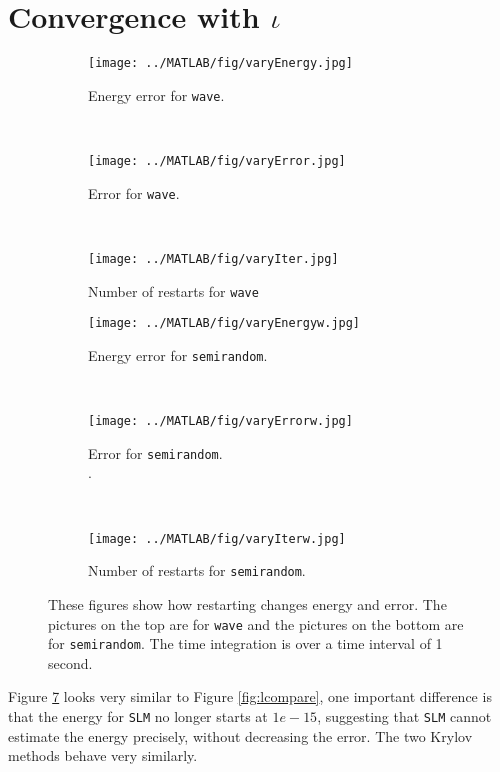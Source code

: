 \section{Convergence with $\iota$} %

\begin{figure}[H]
        \centering
        \begin{subfigure}[b]{0.3\textwidth}
                \texttt{[image: ../MATLAB/fig/varyEnergy.jpg]}
                \caption{ Energy error for \texttt{wave}. }
                \label{fig:varyEnergy}
        \end{subfigure}%
        ~
		\begin{subfigure}[b]{0.3\textwidth}
                \texttt{[image: ../MATLAB/fig/varyError.jpg]}
                \caption{ Error for \texttt{wave}. }
                \label{fig:varyError}
        \end{subfigure}%
        ~
        \begin{subfigure}[b]{0.3\textwidth}
                \texttt{[image: ../MATLAB/fig/varyIter.jpg]}
                \caption{ Number of restarts for \texttt{wave} }
                \label{fig:varyIter}
        \end{subfigure}%
        
        \begin{subfigure}[b]{0.3\textwidth}
                \texttt{[image: ../MATLAB/fig/varyEnergyw.jpg]}
                \caption{ Energy error for \texttt{semirandom}. }
                \label{fig:varyEnergyw}
        \end{subfigure}
		~
        \begin{subfigure}[b]{0.3\textwidth}
                \texttt{[image: ../MATLAB/fig/varyErrorw.jpg]}
                \caption{ Error for \texttt{semirandom}. \\.}
                \label{fig:varyErrorw}
        \end{subfigure}
        ~
        \begin{subfigure}[b]{0.3\textwidth}
                \texttt{[image: ../MATLAB/fig/varyIterw.jpg]}
                \caption{ Number of restarts for \texttt{semirandom}. }
                \label{fig:varyIterw}
        \end{subfigure}
        \caption{ These figures show how restarting changes energy and error. The pictures on the top are for \texttt{wave} and the pictures on the bottom are for \texttt{semirandom}. The time integration is over a time interval of 1 second. }
        \label{fig:variota}
\end{figure}
Figure \ref{fig:variota} looks very similar to Figure \ref{fig:lcompare}, one important difference is that the energy for \texttt{SLM} no longer starts at $1e-15$, suggesting that \texttt{SLM} cannot estimate the energy precisely, without decreasing the error. The two Krylov methods behave very similarly. \\


